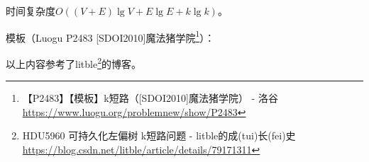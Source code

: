 时间复杂度$O((V+E)\lg V+E \lg E+k \lg k)$。

模板（Luogu P2483 [SDOI2010]魔法猪学院\footnote{
【P2483】【模板】k短路（[SDOI2010]魔法猪学院） - 洛谷
\url{https://www.luogu.org/problemnew/show/P2483}
}）：



以上内容参考了litble\footnote{HDU5960 可持久化左偏树 k短路问题 - litble的成(tui)长(fei)史
	\url{https://blog.csdn.net/litble/article/details/79171311}
}的博客。

